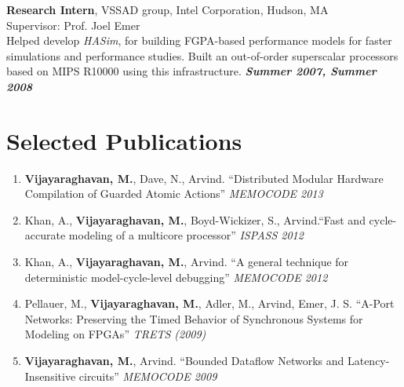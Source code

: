 \documentclass[margin,line]{resume}
\begin{document}
\begin{resume}
    \vspace{-7mm}
    \textbf{Research Intern}, VSSAD group, Intel Corporation, Hudson, MA\\
    Supervisor: Prof. Joel Emer \\
    Helped develop \emph{HASim}, for building FGPA-based performance
          models for faster simulations and performance studies. Built an out-of-order superscalar
          processors based on MIPS R10000 using this infrastructure. \hfill \textbf{\textit{Summer 2007, Summer 2008}}\\
    \vspace{-9mm}
    \section{\mysidestyle Selected Publications}
    \begin{enumerate}
    \item \textbf{Vijayaraghavan, M.}, Dave, N., Arvind.
    ``Distributed Modular Hardware Compilation of Guarded Atomic Actions'' \textit{MEMOCODE 2013}
    \item Khan, A., \textbf{Vijayaraghavan, M.}, Boyd-Wickizer, S., Arvind.``Fast and cycle-accurate modeling of 
    a multicore processor''
    \textit {ISPASS 2012}
    \item Khan, A., \textbf{Vijayaraghavan, M.}, Arvind. ``A general technique for deterministic model-cycle-level debugging''
    \textit{MEMOCODE 2012}
    \item Pellauer, M., \textbf{Vijayaraghavan, M.}, Adler, M., Arvind, Emer, J. S.
    ``A-Port Networks: Preserving the Timed Behavior of Synchronous Systems for
    Modeling on FPGAs'' \textit{TRETS (2009)}
    \item \textbf{Vijayaraghavan, M.}, Arvind. ``Bounded Dataflow Networks and
    Latency-Insensitive circuits'' \textit{MEMOCODE 2009}

\end{enumerate}
\end{resume}
\end{document}
